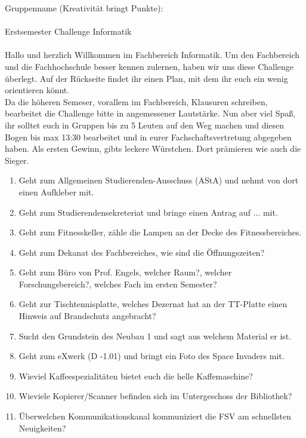 \documentclass[a4paper,15pt]{scrartcl}
\begin{document}
Gruppenname (Kreativität bringt Punkte):\hrulefill
\\
\\
{\huge Erstsemester Challenge Informatik}
\\
\\

Hallo und herzlich Willkommen im Fachbereich Informatik. Um den Fachbereich und die Fachhochschule besser kennen zulernen, haben wir uns diese Challenge überlegt.
Auf der Rückseite findet ihr einen Plan, mit dem ihr euch ein wenig orientieren könnt.\\

Da die höheren Semeser, vorallem im Fachbereich, Klausuren schreiben, bearbeitet die Challenge bitte in angemessener Lautstärke. Nun aber viel Spaß, ihr solltet euch in Gruppen bis zu 5 Leuten auf den Weg machen und diesen Bogen bis max 13:30 bearbeitet und in eurer Fachschaftsvertretung abgegeben haben. Als ersten Gewinn, gibts leckere Würstchen. Dort prämieren wie auch die Sieger.

\begin{enumerate}
	\item Geht zum Allgemeinen Studierenden-Ausschuss (AStA) und nehmt von dort einen Aufkleber mit.
	\item Geht zum Studierendensekreteriat und bringe einen Antrag auf ... mit.
	\item Geht zum Fitnesskeller, zähle die Lampen an der Decke des Fitnessbereiches.
	\item Geht zum Dekanat des Fachbereiches, wie sind die Öffnungszeiten?
	\item Geht zum Büro von Prof. Engels, welcher Raum?, welcher Forschungsbereich?, welches Fach im ersten Semester?
	\item Geht zur Tischtennisplatte, welches Dezernat hat an der TT-Platte einen Hinweis auf Brandschutz angebracht?
	\item Sucht den Grundstein des Neubau 1 und sagt aus welchem Material er ist.
	\item Geht zum eXwerk (D -1.01) und bringt ein Foto des Space Invaders mit.
	\item Wieviel Kaffeespezialitäten bietet euch die helle Kaffemaschine?
	\item Wieviele Kopierer/Scanner befinden sich im Untergeschoss der Bibliothek?
	\item Überwelchen Kommunikationskanal kommuniziert die FSV am schnellsten Neuigkeiten?
\end{enumerate}
\end{document}

